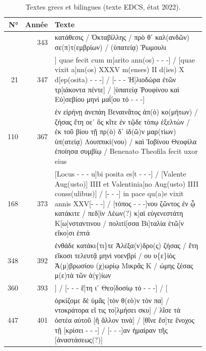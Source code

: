 \begin{longtable}{@{}r r p{0.78\linewidth}@{}}\caption{Textes grecs et bilingues (texte EDCS, état 2022).}\label{tab:grecs}\\\toprule N° & Année & Texte\\\midrule\endfirsthead\bottomrule\endfoot
8 & 343 & {\small κατάθεσις / Ὀκταβίλλης / πρὸ θʹ καλ(ανδῶν) σε(π)τ(εμβρίων) / (ὑπατείᾳ) Ῥωμουλι} \\
21 & 347 & {\small ] quae fecit cum m[arito ann(os) - - -] / [quae vixit a]nn(os) XXXV m(enses) II d(ies) X d[ep(osita) - - -] / [- - - Ἡ]λιοδώρα ἐτῶν τρ[ιάκοντα πέντε] / [ὑπατείᾳ Ῥουφίνου καὶ Εὐ]σεβίου μηνὶ μαΐ[ου τό - - -]} \\
110 & 367 & {\small ἐν εἰρήνῃ ἀνεπάη Βεναινᾶτος ἀπ(ὸ) κο(μήτων) / ζήσας ἔτη οεʹ ὃς κῖτε ἐν τῷδε τόπῳ ἐξελτὼν / ἐκ τοῦ βίου τῇ πρ(ὸ) δʹ ἰδ(ῶ)ν μαρ(τίων) ὑπ(ατείᾳ) Λουππικί(νου) / καὶ Ἰοβίνου Θεοφίλα ἐποίησα συμβίῳ / Benenato Theofila fecit uxor eius} \\
168 & 373 & {\small [Locus - - - u]bi posita es[t - - -] / [Valente Aug(usto)] IIII et Valentinia[no Aug(usto) IIII conss(ulibus)] / [- - -] in pace qu(a)e vixit annis XXV[- - -] / [τόπος - - -]νου ζῶντος ἐν ᾧ κατάκιτε / πεδ[ὶν Λέων(?) κ]αὶ εὐγενεστάτη Κ[ω]νσταντινου / πολιτί[σσα Βι]ταλία ἐτῶ[ν εἴκο]σι ἑπτά} \\
348 & 392 & {\small ἐνθάδε κατάκι\{τι\}τε Ἀλέξα(ν)δρο(ς) ζήσας / ἔτη εἴκοσι τελευτᾷ μηνὶ νοενβρί / ου υ\{ε\}ἱὸς Ἀ(μ)βρωσίου (χ)ωρίῳ Μικρᾶς Κ / ώμης ζέσας μ(ε)τὰ τῶν ἁ(γ)ίων} \\
360 & 393 & {\small ] / [- - - ἔ]τη ιʹ Θεο[δοσίῳ τό - - -] / [} \\
447 & 401 & {\small ὁρκίζομε δὲ ὑμᾶς [τὸν θ(εὸ)ν τὸν πα] / ντοκράτορα εἴ τις το[λμήσει σκυ] / λῖσε τὰ ὀστέα αὐτοῦ [ἢ ἄλλον τινὰ] / [θῖνε ἔσ]τε ἔνοχος τῇ [κρίσει - - -] / [- - -]αν ἡμαίραν τῆς [ἀναστάσεως(?)]} \\
\end{longtable}
